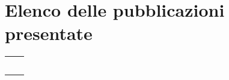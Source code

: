 \section*{Elenco delle pubblicazioni presentate}
\begin{center}
\begin{tabularx}{\textwidth}{p{}p{}}
	\myTextField[1.5cm]{} & \titleTextField[.75\textwidth]{} \\[.5em]
	\myTextField[1.5cm]{} & \titleTextField[.75\textwidth]{} \\[.5em]
	\myTextField[1.5cm]{} & \titleTextField[.75\textwidth]{} \\[.5em]
	\myTextField[1.5cm]{} & \titleTextField[.75\textwidth]{} \\[.5em]
	\myTextField[1.5cm]{} & \titleTextField[.75\textwidth]{}
\end{tabularx}
\end{center}
